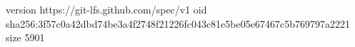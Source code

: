 version https://git-lfs.github.com/spec/v1
oid sha256:3f57c0a42dbd74be3a4f2748f21226fc043c81e5be05e67467c5b769797a2221
size 5901
